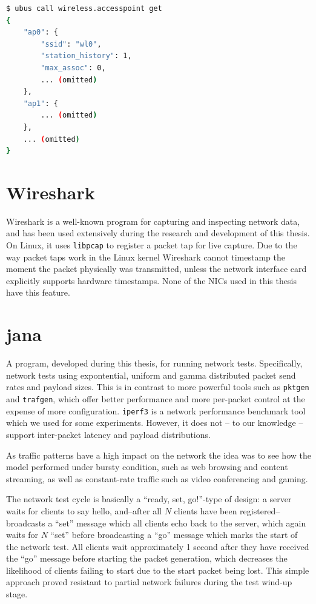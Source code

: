 \begin{lstlisting}[language=bash,caption={ubus call listing all access points on this device},label=lst:ubusex]
$ ubus call wireless.accesspoint get
{
    "ap0": {
        "ssid": "wl0",
        "station_history": 1,
        "max_assoc": 0,
        ... (omitted)
    },
    "ap1": {
        ... (omitted)
    },
    ... (omitted)
}
\end{lstlisting}

\section{Wireshark}

Wireshark is a well-known program for capturing and inspecting network data,
and has been used extensively during the research and development of this
thesis. On Linux, it uses \texttt{libpcap} to register a packet tap for live
capture. Due to the way packet taps work in the Linux kernel Wireshark cannot
timestamp the moment the packet physically was transmitted, unless the network
interface card explicitly supports hardware timestamps. None of the NICs used
in this thesis have this feature.

\section{jana}

A program, developed during this thesis, for running network tests.
Specifically, network tests using expontential, uniform and gamma distributed
packet send rates and payload sizes. This is in contrast to more powerful
tools such as \texttt{pktgen} and \texttt{trafgen}, which offer better
performance and more per-packet control at the expense of more configuration.
\texttt{iperf3} is a network performance benchmark tool which we used for some
experiments. However, it does not -- to our knowledge -- support inter-packet
latency and payload distributions.

As traffic patterns have a high impact on the network the idea was to see how
the model performed under bursty condition, such as web browsing and content
streaming, as well as constant-rate traffic such as video conferencing and
gaming.

The network test cycle is basically a ``ready, set, go!''-type of design: a
server waits for clients to say hello, and--after all $N$ clients have been
registered--broadcasts a ``set'' message which all clients echo back to the
server, which again waits for $N$ ``set'' before broadcasting a ``go''
message which marks the start of the network test. All clients wait
approximately 1 second after they have received the ``go'' message before
starting the packet generation, which decreases the likelihood of clients
failing to start due to the start packet being lost. This simple approach
proved resistant to partial network failures during the test wind-up stage.

